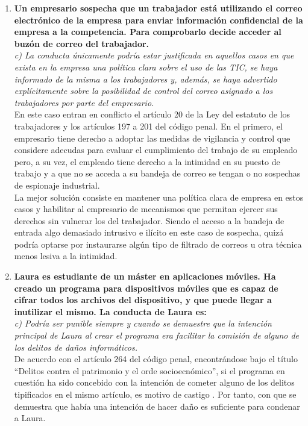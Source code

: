 \documentclass[10pt,a4paper]{article}
\begin{document}
\begin{enumerate}
\item \textbf{Un empresario sospecha que un trabajador está utilizando el correo electrónico de la empresa para enviar información confidencial de la empresa a la competencia. Para comprobarlo decide acceder al buzón de correo del trabajador.}\\
\textit{c) La conducta únicamente podría estar justificada en aquellos casos en que
exista en la empresa una política clara sobre el uso de las TIC, se haya
informado de la misma a los trabajadores y, además, se haya advertido
explícitamente sobre la posibilidad de control del correo asignado a los
trabajadores por parte del empresario.}\\
En este caso entran en conflicto el artículo 20 de la Ley del estatuto de los trabajadores y los artículos 197 a 201 del código penal. En el primero, el empresario tiene derecho a adoptar las medidas de vigilancia y control que considere adecudas para evaluar el cumplimiento del trabajo de su empleado \cite{trabajo} pero, a su vez, el empleado tiene derecho a la intimidad en su puesto de trabajo y a que no se acceda a su bandeja de correo se tengan o no sospechas de espionaje industrial.\\
La mejor solución consiste en mantener una política clara de empresa en estos casos y habilitar al empresario de mecanismos que permitan ejercer sus derechos sin vulnerar los del trabajador. Siendo el acceso a la bandeja de entrada algo demasiado intrusivo e ilícito en este caso de sospecha, quizá podría optarse por instaurarse algún tipo de filtrado de correos u otra técnica menos lesiva a la intimidad.

\item \textbf{ Laura es estudiante de un máster en aplicaciones móviles. Ha creado un programa para dispositivos móviles que es capaz de cifrar todos los archivos del dispositivo, y que puede llegar a inutilizar el mismo. La conducta de Laura es: }\\
\textit{c) Podría ser punible siempre y cuando se demuestre que la intención principal
de Laura al crear el programa era facilitar la comisión de alguno de los
delitos de daños informáticos.}\\
De acuerdo con el artículo 264 del código penal, encontrándose bajo el título ``Delitos contra el patrimonio y el orde socioecnómico'', si el programa en cuestión ha sido concebido con la intención de cometer alguno de los delitos tipificados en el mismo artículo, es motivo de castigo \cite[Art. 264 ter.b]{cp}. Por tanto, con que se demuestra que había una intención de hacer daño es suficiente para condenar a Laura.


\end{enumerate}
\end{document}
